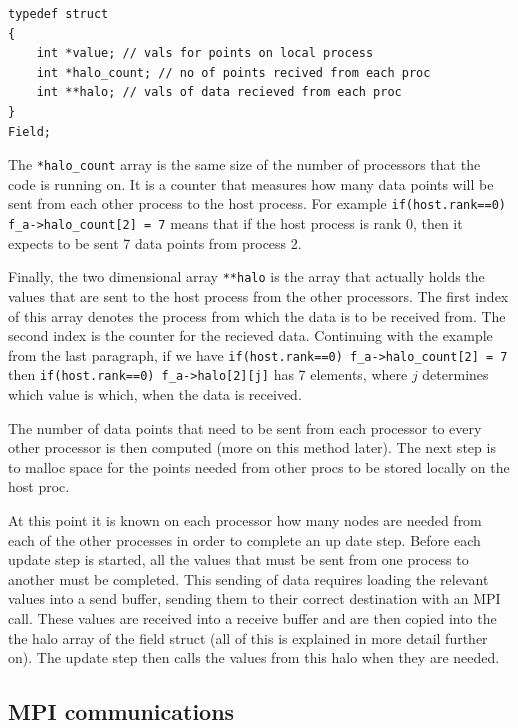 \documentclass[pdftex,12pt,a4paper]{article}
\begin{document}
\begin{lstlisting}
typedef struct
{
	int *value;	// vals for points on local process
	int *halo_count; // no of points recived from each proc
	int **halo;	// vals of data recieved from each proc	
}
Field;
\end{lstlisting}

The \verb|*halo_count| array is the same size of the number of processors that the code is running on. It is a counter that measures how many data points will be sent from each other process to the host process. For example \verb|if(host.rank==0) f_a->halo_count[2] = 7| means that if the host process is rank 0, then it expects to be sent 7 data points from process 2.

Finally, the two dimensional array \verb|**halo| is the array that actually holds the values that are sent to the host process from the other processors. The first index of this array denotes the process from which the data is to be received from. The second index is the counter for the recieved data. Continuing with the example from the last paragraph, if we have \verb|if(host.rank==0) f_a->halo_count[2] = 7| then \verb|if(host.rank==0) f_a->halo[2][j]| has 7 elements, where $j$ determines which value is which, when the data is received.

The number of data points that need to be sent from each processor to every other processor is then computed (more on this method later). The next step is to malloc space for the points needed from other procs to be stored locally on the host proc.

At this point it is known on each processor how many nodes are needed from each of the other processes in order to complete an up date step. Before each update step is started, all the values that must be sent from one process to another must be completed. This sending of data requires loading the relevant values into a send buffer, sending them to their correct destination with an MPI call. These values are received into a receive buffer and are then copied into the the halo array of the field struct (all of this is explained in more detail further on). The update step then calls the values from this halo when they are needed.




\subsection{MPI communications}
\end{document}
